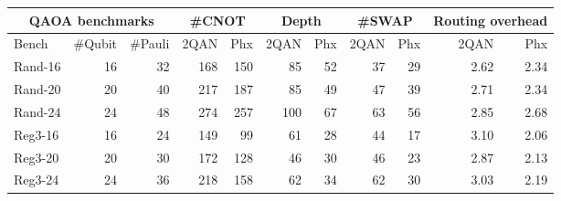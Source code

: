 \begin{tabular}{|l|r|r|r|r|r|r|r|r|r|r|}
    \hline
    \multicolumn{3}{|c|}{QAOA benchmarks} & \multicolumn{2}{c|}{\#CNOT} & \multicolumn{2}{c|}{Depth} & \multicolumn{2}{c|}{\#SWAP} & \multicolumn{2}{c|}{Routing overhead} \\ 
    \hline
    Bench & \#Qubit & \#Pauli & 2QAN & Phx & 2QAN & Phx & 2QAN & Phx & 2QAN & Phx \\
    \hline
    Rand-16 & 16 & 32 & 168 & 150 & 85 & 52 & 37 & 29 & 2.62 & 2.34 \\
    Rand-20 & 20 & 40 & 217 & 187 & 85 & 49 & 47 & 39 & 2.71 & 2.34 \\
    Rand-24 & 24 & 48 & 274 & 257 & 100 & 67 & 63 & 56 & 2.85 & 2.68 \\
    Reg3-16 & 16 & 24 & 149 & 99 & 61 & 28 & 44 & 17 & 3.10 & 2.06 \\
    Reg3-20 & 20 & 30 & 172 & 128 & 46 & 30 & 46 & 23 & 2.87 & 2.13 \\
    Reg3-24 & 24 & 36 & 218 & 158 & 62 & 34 & 62 & 30 & 3.03 & 2.19 \\
    \hline
\end{tabular}
    